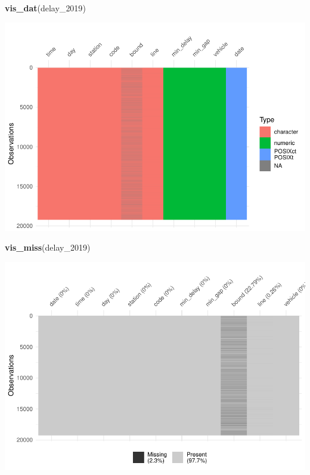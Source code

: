 \documentclass[
]{book}
\newenvironment{Shaded}{\begin{snugshade}}{\end{snugshade}}
\newcommand{\DecValTok}[1]{\textcolor[rgb]{0.00,0.00,0.81}{#1}}
\newcommand{\KeywordTok}[1]{\textcolor[rgb]{0.13,0.29,0.53}{\textbf{#1}}}
\newcommand{\NormalTok}[1]{#1}
\begin{document}
\begin{Shaded}
\begin{Highlighting}[]
\KeywordTok{vis_dat}\NormalTok{(delay_}\DecValTok{2019}\NormalTok{)}
\end{Highlighting}
\end{Shaded}

\includegraphics{telling_stories_with_data_files/figure-latex/unnamed-chunk-253-1.pdf}

\begin{Shaded}
\begin{Highlighting}[]
\KeywordTok{vis_miss}\NormalTok{(delay_}\DecValTok{2019}\NormalTok{)}
\end{Highlighting}
\end{Shaded}

\includegraphics{telling_stories_with_data_files/figure-latex/unnamed-chunk-253-2.pdf}
\end{document}
